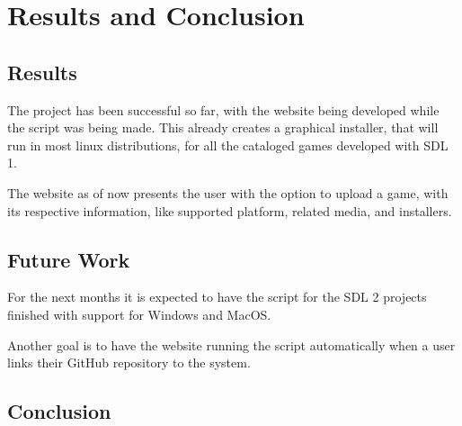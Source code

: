 \chapter[Results and Conclusion]{Results and Conclusion}

\section[Results]{Results}

The project has been successful so far, with the website being developed while the script was being made. This already creates a graphical installer, that will run in most linux distributions, for all the cataloged games developed with SDL 1.

The website as of now presents the user with the option to upload a game, with its respective information, like supported platform, related media, and installers.

\section[Future Work]{Future Work}

For the next months it is expected to have the script for the SDL 2 projects finished with support for Windows and MacOS.

Another goal is to have the website running the script automatically when a user links their GitHub repository to the system.

\section[Conclusion]{Conclusion}

